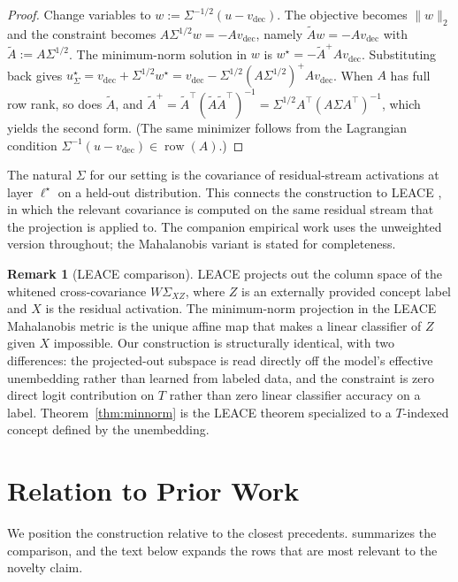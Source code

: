 \documentclass[11pt,letterpaper]{article}
\theoremstyle{plain}
\theoremstyle{definition}
\newtheorem{remark}[theorem]{Remark}
\DeclareMathOperator{\rowsp}{row}
\newcommand{\1}{\mathbf{1}}
\newcommand{\vdec}{v_{\text{dec}}}
\begin{document}
\begin{proof}
Change variables to $w := \Sigma^{-1/2}(u - \vdec)$. The objective becomes $\|w\|_2$ and the constraint becomes $A \Sigma^{1/2} w = -A \vdec$, namely $\widetilde{A} w = -A\vdec$ with $\widetilde{A} := A \Sigma^{1/2}$. The minimum-norm solution in $w$ is $w^\star = -\widetilde{A}^+ A \vdec$. Substituting back gives $u^\star_\Sigma = \vdec + \Sigma^{1/2} w^\star = \vdec - \Sigma^{1/2} (A \Sigma^{1/2})^+ A \vdec$. When $A$ has full row rank, so does $\widetilde{A}$, and $\widetilde{A}^+ = \widetilde{A}^\top (\widetilde{A} \widetilde{A}^\top)^{-1} = \Sigma^{1/2} A^\top (A \Sigma A^\top)^{-1}$, which yields the second form. (The same minimizer follows from the Lagrangian condition $\Sigma^{-1}(u - \vdec) \in \rowsp(A)$.)
\end{proof}

The natural $\Sigma$ for our setting is the covariance of residual-stream activations at layer $\ell^\star$ on a held-out distribution. This connects the construction to LEACE \cite{belrose2023leace}, in which the relevant covariance is computed on the same residual stream that the projection is applied to. The companion empirical work uses the unweighted version throughout; the Mahalanobis variant is stated for completeness.

\begin{remark}[LEACE comparison]\label{rem:leace}
LEACE projects out the column space of the whitened cross-covariance $W \Sigma_{XZ}$, where $Z$ is an externally provided concept label and $X$ is the residual activation. The minimum-norm projection in the LEACE Mahalanobis metric is the unique affine map that makes a linear classifier of $Z$ given $X$ impossible. Our construction is structurally identical, with two differences: the projected-out subspace is read directly off the model's effective unembedding rather than learned from labeled data, and the constraint is zero direct logit contribution on $T$ rather than zero linear classifier accuracy on a label. Theorem~\ref{thm:minnorm} is the LEACE theorem specialized to a $T$-indexed concept defined by the unembedding.
\end{remark}

\section{Relation to Prior Work}\label{sec:related}

We position the construction relative to the closest precedents.  summarizes the comparison, and the text below expands the rows that are most relevant to the novelty claim.
\end{document}
